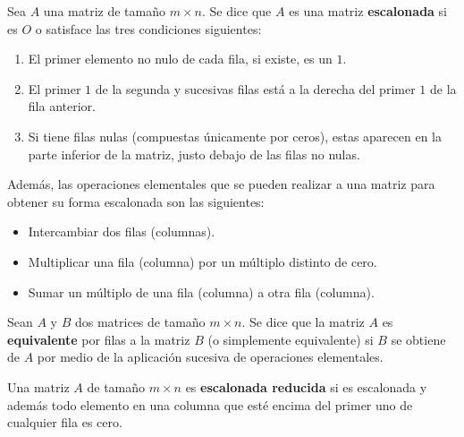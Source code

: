 \begin{definicion}
    Sea $A$ una matriz de tamaño $m \times n$. Se dice que $A$ es una matriz \textbf{escalonada} si es $O$ o satisface las tres condiciones siguientes:

    \begin{enumerate}
        \item El primer elemento no nulo de cada fila, si existe, es un $1$.
        \item El primer $1$ de la segunda y sucesivas filas está a la derecha del primer $1$ de la fila anterior.
        \item Si tiene filas nulas (compuestas únicamente por ceros), estas aparecen en la parte inferior de la matriz, justo debajo de las filas no nulas.
    \end{enumerate}

    Además, las operaciones elementales que se pueden realizar a una matriz para obtener su forma escalonada son las siguientes:

    \begin{itemize}
        \item Intercambiar dos filas (columnas).
        \item Multiplicar una fila (columna) por un múltiplo distinto de cero.
        \item Sumar un múltiplo de una fila (columna) a otra fila (columna).
    \end{itemize}
\end{definicion}

\begin{definicion}
    Sean $A$ y $B$ dos matrices de tamaño $m \times n$. Se dice que la matriz $A$ es \textbf{equivalente} por filas a la matriz $B$ (o simplemente equivalente) si $B$ se obtiene de $A$ por medio de la aplicación sucesiva de operaciones elementales.
\end{definicion}

\begin{definicion}
    Una matriz $A$ de tamaño $m \times n$ es \textbf{escalonada reducida} si es escalonada y además todo elemento en una columna que esté encima del primer uno de cualquier fila es cero.
\end{definicion}

